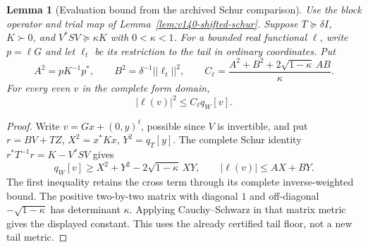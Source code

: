 \documentclass[11pt]{article}
\def\norm#1{||#1||}%
\newtheorem{lemma}[theorem]{Lemma}
\theoremstyle{remark}
\newcommand{\norm}[1]{\left\lVert #1\right\rVert}
\begin{document}
\begin{lemma}[Evaluation bound from the archived Schur comparison]
\label{lem:v143-evaluator-dual}
Use the block operator and trial map of
Lemma~\ref{lem:v140-shifted-schur}. Suppose $T\succeq\delta I$,
$K\succ0$, and $V^*SV\succeq\kappa K$ with $0<\kappa<1$.
For a bounded real functional $\ell$, write $p=\ell G$ and let
$\ell_t$ be its restriction to the tail in ordinary coordinates. Put
\[
 A^2=pK^{-1}p^*,\qquad B^2=\delta^{-1}\norm{\ell_t}^2,
 \qquad
 C_\ell=\frac{A^2+B^2+2\sqrt{1-\kappa}\,AB}{\kappa}.
\]
For every even $v$ in the complete form domain,
\[
 |\ell(v)|^2\le C_\ell q_W[v].
\]
\end{lemma}
\begin{proof}
Write $v=Gx+(0,y)^t$, possible since $V$ is invertible, and put
$r=BV+TZ$, $X^2=x^*Kx$, $Y^2=q_T[y]$. The complete Schur identity
$r^*T^{-1}r=K-V^*SV$ gives
\[
 q_W[v]\ge X^2+Y^2-2\sqrt{1-\kappa}\,XY,
 \qquad |\ell(v)|\le AX+BY.
\]
The first inequality retains the cross term through its complete
inverse-weighted bound. The positive two-by-two matrix with diagonal
$1$ and off-diagonal $-\sqrt{1-\kappa}$ has determinant $\kappa$.
Applying Cauchy--Schwarz in that matrix metric gives the displayed
constant. This uses the already certified tail floor, not a new tail metric.
\end{proof}
\end{document}
